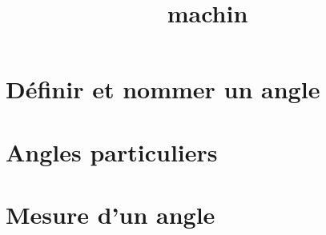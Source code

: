 \documentclass[12pt,a4paper]{article}
\date{}
\title{machin}
\begin{document}
%
%

%

%
%
%
%
%
%
%
%
\section{Définir et nommer un angle}



\section{Angles particuliers}



\section{Mesure d'un angle}


\end{document}
